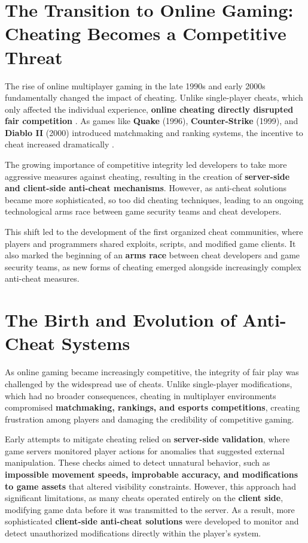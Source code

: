 \section{The Transition to Online Gaming: Cheating Becomes a Competitive Threat}

The rise of online multiplayer gaming in the late 1990s and early 2000s fundamentally changed the impact of cheating. Unlike single-player cheats, which only affected the individual experience, \textbf{online cheating directly disrupted fair competition} \parencite{yan2005cheats}. As games like \textbf{Quake} (1996), \textbf{Counter-Strike} (1999), and \textbf{Diablo II} (2000) introduced matchmaking and ranking systems, the incentive to cheat increased dramatically \parencite{young2016history}.

The growing importance of competitive integrity led developers to take more aggressive measures against cheating, resulting in the creation of \textbf{server-side and client-side anti-cheat mechanisms}. However, as anti-cheat solutions became more sophisticated, so too did cheating techniques, leading to an ongoing technological arms race between game security teams and cheat developers.


This shift led to the development of the first organized cheat communities, where players and programmers shared exploits, scripts, and modified game clients. It also marked the beginning of an \textbf{arms race} between cheat developers and game security teams, as new forms of cheating emerged alongside increasingly complex anti-cheat measures.

\section{The Birth and Evolution of Anti-Cheat Systems}

As online gaming became increasingly competitive, the integrity of fair play was challenged by the widespread use of cheats. Unlike single-player modifications, which had no broader consequences, cheating in multiplayer environments compromised \textbf{matchmaking, rankings, and esports competitions}, creating frustration among players and damaging the credibility of competitive gaming. 

Early attempts to mitigate cheating relied on \textbf{server-side validation}, where game servers monitored player actions for anomalies that suggested external manipulation. These checks aimed to detect unnatural behavior, such as \textbf{impossible movement speeds, improbable accuracy, and modifications to game assets} that altered visibility constraints. However, this approach had significant limitations, as many cheats operated entirely on the \textbf{client side}, modifying game data before it was transmitted to the server. As a result, more sophisticated \textbf{client-side anti-cheat solutions} were developed to monitor and detect unauthorized modifications directly within the player’s system.

